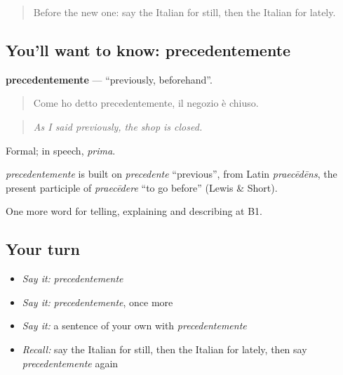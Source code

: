 \label{lesson:IT-C280-precedentemente}



\begin{quote}
Before the new one: say the Italian for still, then the Italian for lately.
\end{quote}

\subsection*{You'll want to know: precedentemente}
\textbf{precedentemente} — \textquotedblleft{}previously, beforehand\textquotedblright{}.

\begin{quote}
Come ho detto precedentemente, il negozio è chiuso.
\end{quote}

\begin{quote}
\emph{As I said previously, the shop is closed.}
\end{quote}

Formal; in speech, \emph{prima}.

\begin{cousinweb}
\emph{precedentemente} is built on \emph{precedente} \textquotedblleft{}previous\textquotedblright{}, from Latin \emph{praecēdēns}, the present participle of \emph{praecēdere} \textquotedblleft{}to go before\textquotedblright{} (Lewis \& Short).
\end{cousinweb}

\begin{grammarlens}[title={What you've built}]
One more word for telling, explaining and describing at B1.
\end{grammarlens}

\subsection*{Your turn}
\begin{itemize}
\raggedright
  \item \emph{Say it:} \emph{precedentemente}
  \item \emph{Say it:} \emph{precedentemente}, once more
  \item \emph{Say it:} a sentence of your own with \emph{precedentemente}
  \item \emph{Recall:} say the Italian for still, then the Italian for lately, then say \emph{precedentemente} again
\end{itemize}

